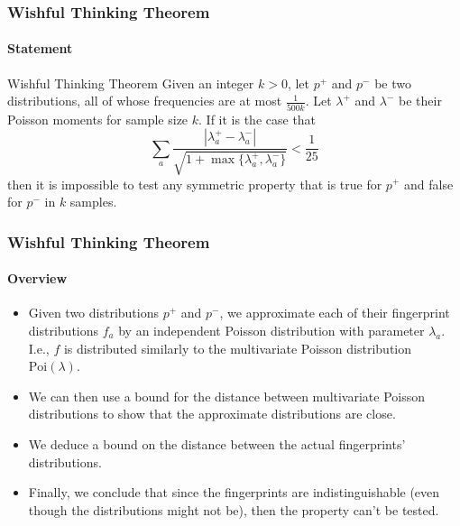 \documentclass[handout]{beamer}
\begin{document}
\begin{frame}
  \frametitle{Wishful Thinking Theorem} \framesubtitle{Statement}

  \begin{block}{Wishful Thinking Theorem}
    Given an integer $k>0$, let $p^+$ and $p^-$ be two distributions,
    all of whose frequencies are at most $\frac{1}{500k}$. Let
    $\lambda^+$ and $\lambda^-$ be their Poisson moments for sample
    size $k$. If it is the case that
    \begin{equation*}
      \sum_a\frac{|\lambda^+_a-\lambda^-_a|}{\sqrt{1+\max\{\lambda^+_a,\lambda^-_a\}}}<\frac{1}{25}
    \end{equation*}
    then it is impossible to test any symmetric property that is true
    for $p^+$ and false for $p^-$ in $k$ samples.
  \end{block}

\end{frame}

\begin{frame}
  \frametitle{Wishful Thinking Theorem} \framesubtitle{Overview}

  \begin{itemize}
  \item<1-> Given two distributions $p^+$ and $p^-$, we approximate
    each of their fingerprint distributions $f_a$ by an independent
    Poisson distribution with parameter $\lambda_a$. I.e., $f$ is
    distributed similarly to the multivariate Poisson distribution
    $\mbox{Poi}(\lambda)$.
  \item<2-> We can then use a bound for the distance between multivariate
    Poisson distributions to show that the approximate distributions
    are close.
  \item<3-> We deduce a bound on the distance between the
    actual fingerprints' distributions.
  \item<4-> Finally, we conclude that since the fingerprints are
    indistinguishable (even though the distributions might not be),
    then the property can't be tested.
  \end{itemize}

\end{frame}
\end{document}
